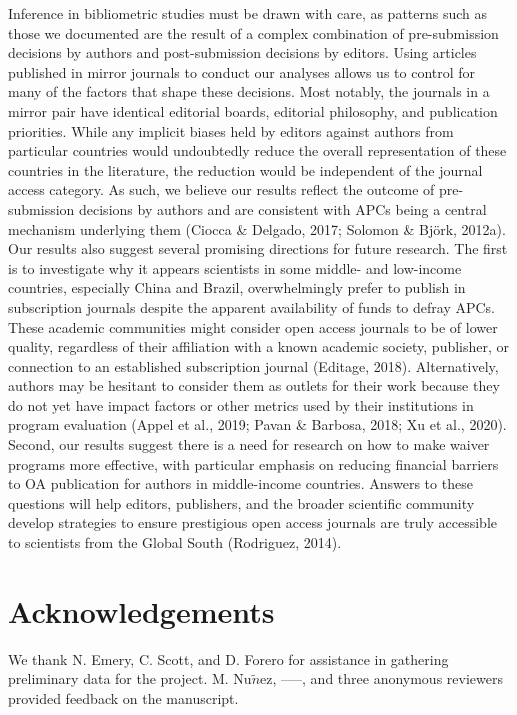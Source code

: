 \documentclass[
  english,
  man]{apa6}
\begin{document}
Inference in bibliometric studies must be drawn with care, as patterns such as those we documented are the result of a complex combination of pre-submission decisions by authors and post-submission decisions by editors. Using articles published in mirror journals to conduct our analyses allows us to control for many of the factors that shape these decisions. Most notably, the journals in a mirror pair have identical editorial boards, editorial philosophy, and publication priorities. While any implicit biases held by editors against authors from particular countries would undoubtedly reduce the overall representation of these countries in the literature, the reduction would be independent of the journal access category. As such, we believe our results reflect the outcome of pre-submission decisions by authors and are consistent with APCs being a central mechanism underlying them (Ciocca \& Delgado, 2017; Solomon \& Björk, 2012a). Our results also suggest several promising directions for future research. The first is to investigate why it appears scientists in some middle- and low-income countries, especially China and Brazil, overwhelmingly prefer to publish in subscription journals despite the apparent availability of funds to defray APCs. These academic communities might consider open access journals to be of lower quality, regardless of their affiliation with a known academic society, publisher, or connection to an established subscription journal (Editage, 2018). Alternatively, authors may be hesitant to consider them as outlets for their work because they do not yet have impact factors or other metrics used by their institutions in program evaluation (Appel et al., 2019; Pavan \& Barbosa, 2018; Xu et al., 2020). Second, our results suggest there is a need for research on how to make waiver programs more effective, with particular emphasis on reducing financial barriers to OA publication for authors in middle-income countries. Answers to these questions will help editors, publishers, and the broader scientific community develop strategies to ensure prestigious open access journals are truly accessible to scientists from the Global South (Rodriguez, 2014).

\hypertarget{acknowledgements}{%
\section{Acknowledgements}\label{acknowledgements}}

We thank N. Emery, C. Scott, and D. Forero for assistance in gathering preliminary data for the project. M. Nu\(\tilde{n}\)ez, -----, and three anonymous reviewers provided feedback on the manuscript.
\end{document}
